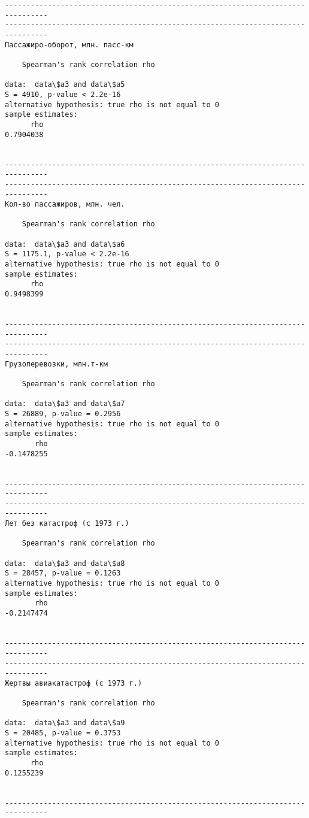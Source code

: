 \documentclass[11pt,mathletters]{article}
\begin{document}
\begin{Verbatim}[commandchars=\\\{\}]
--------------------------------------------------------------------------------
--------------------------------------------------------------------------------
Пассажиро-оборот, млн. пасс-км

	Spearman's rank correlation rho

data:  data\$a3 and data\$a5
S = 4910, p-value < 2.2e-16
alternative hypothesis: true rho is not equal to 0
sample estimates:
      rho 
0.7904038 


--------------------------------------------------------------------------------
--------------------------------------------------------------------------------
Кол-во пассажиров, млн. чел. 

	Spearman's rank correlation rho

data:  data\$a3 and data\$a6
S = 1175.1, p-value < 2.2e-16
alternative hypothesis: true rho is not equal to 0
sample estimates:
      rho 
0.9498399 


--------------------------------------------------------------------------------
--------------------------------------------------------------------------------
Грузоперевозки, млн.т-км

	Spearman's rank correlation rho

data:  data\$a3 and data\$a7
S = 26889, p-value = 0.2956
alternative hypothesis: true rho is not equal to 0
sample estimates:
       rho 
-0.1478255 


--------------------------------------------------------------------------------
--------------------------------------------------------------------------------
Лет без катастроф (с 1973 г.)

	Spearman's rank correlation rho

data:  data\$a3 and data\$a8
S = 28457, p-value = 0.1263
alternative hypothesis: true rho is not equal to 0
sample estimates:
       rho 
-0.2147474 


--------------------------------------------------------------------------------
--------------------------------------------------------------------------------
Жертвы авиакатастроф (с 1973 г.)

	Spearman's rank correlation rho

data:  data\$a3 and data\$a9
S = 20485, p-value = 0.3753
alternative hypothesis: true rho is not equal to 0
sample estimates:
      rho 
0.1255239 


--------------------------------------------------------------------------------

    \end{Verbatim}
\end{document}
